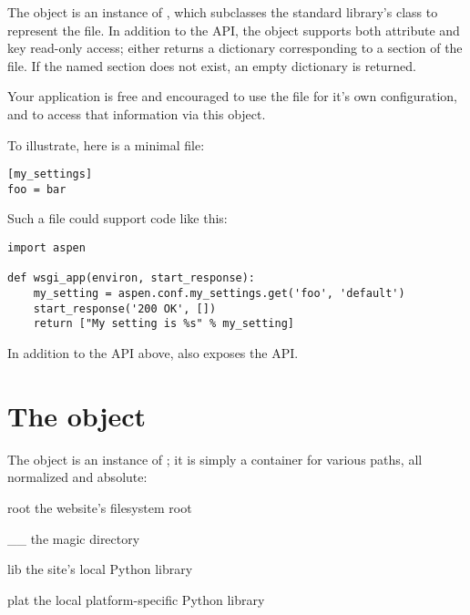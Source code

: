 The  object is an instance of
, which subclasses the standard library's
 class to represent the
 file. In addition to the  API,
the object supports both attribute and key read-only access; either returns a
dictionary corresponding to a section of the  file. If the
named section does not exist, an empty dictionary is returned.

Your application is free and encouraged to use the  file for
it's own configuration, and to access that information via this object.

To illustrate, here is a minimal  file:

\begin{verbatim}
[my_settings]
foo = bar
\end{verbatim}

Such a file could support code like this:

\begin{verbatim}
import aspen

def wsgi_app(environ, start_response):
    my_setting = aspen.conf.my_settings.get('foo', 'default')
    start_response('200 OK', [])
    return ["My setting is %s" % my_setting]
\end{verbatim}


\begin{seealso}

{}{In addition to the API above,  also
exposes the  API.}

\end{seealso}



\section{The  object}
\label{api-paths}

The  object is an instance of
; it is simply a container for various paths,
all normalized and absolute:

\begin{memberdesc}[string]{root}
the website's filesystem root
\end{memberdesc}

\begin{memberdesc}[string]{__}
the magic directory
\end{memberdesc}

\begin{memberdesc}[string]{lib}
the site's local Python library
\end{memberdesc}

\begin{memberdesc}[string]{plat}
the local platform-specific Python library
\end{memberdesc}
